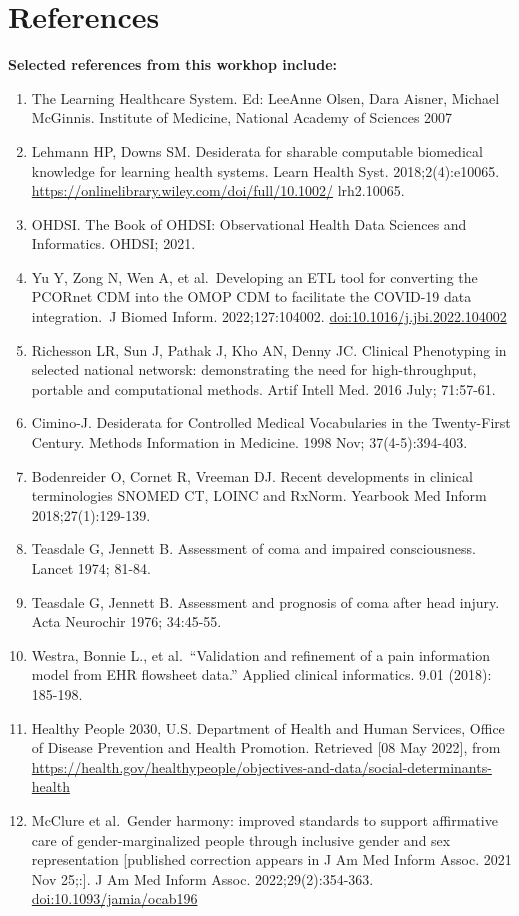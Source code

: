 \documentclass[
]{journal}
\providecommand{\tightlist}{%
  \setlength{\itemsep}{0pt}\setlength{\parskip}{0pt}}
\begin{document}
\hypertarget{references}{%
\section{References}\label{references}}

\textbf{Selected references from this workhop include:}

\begin{enumerate}
\def\labelenumi{\arabic{enumi}.}
\tightlist
\item
  The Learning Healthcare System. Ed: LeeAnne Olsen, Dara Aisner, Michael McGinnis. Institute of Medicine, National Academy of Sciences 2007
\item
  Lehmann HP, Downs SM. Desiderata for sharable computable biomedical knowledge for learning health systems. Learn Health Syst. 2018;2(4):e10065. \url{https://onlinelibrary.wiley.com/doi/full/10.1002/} lrh2.10065.
\item
  OHDSI. The Book of OHDSI: Observational Health Data Sciences and Informatics. OHDSI; 2021.
\item
  Yu Y, Zong N, Wen A, et al.~Developing an ETL tool for converting the PCORnet CDM into the OMOP CDM to facilitate the COVID-19 data integration.~J Biomed Inform. 2022;127:104002. \url{doi:10.1016/j.jbi.2022.104002}
\item
  Richesson LR, Sun J, Pathak J, Kho AN, Denny JC. Clinical Phenotyping in selected national networsk: demonstrating the need for high-throughput, portable and computational methods. Artif Intell Med. 2016 July; 71:57-61.
\item
  Cimino-J. Desiderata for Controlled Medical Vocabularies in the Twenty-First Century. Methods Information in Medicine. 1998 Nov; 37(4-5):394-403.
\item
  Bodenreider O, Cornet R, Vreeman DJ. Recent developments in clinical terminologies SNOMED CT, LOINC and RxNorm. Yearbook Med Inform 2018;27(1):129-139.
\item
  Teasdale G, Jennett B. Assessment of coma and impaired consciousness. Lancet 1974; 81-84.
\item
  Teasdale G, Jennett B. Assessment and prognosis of coma after head injury. Acta Neurochir 1976; 34:45-55.
\item
  Westra, Bonnie L., et al.~``Validation and refinement of a pain information model from EHR flowsheet data.'' Applied clinical informatics. 9.01 (2018): 185-198.
\item
  Healthy People 2030, U.S. Department of Health and Human Services, Office of Disease Prevention and Health Promotion. Retrieved {[}08 May 2022{]}, from \url{https://health.gov/healthypeople/objectives-and-data/social-determinants-health}
\item
  McClure et al.~Gender harmony: improved standards to support affirmative care of gender-marginalized people through inclusive gender and sex representation {[}published correction appears in J Am Med Inform Assoc. 2021 Nov 25;:{]}. J Am Med Inform Assoc. 2022;29(2):354-363. \url{doi:10.1093/jamia/ocab196}
\end{enumerate}

  
\end{document}
